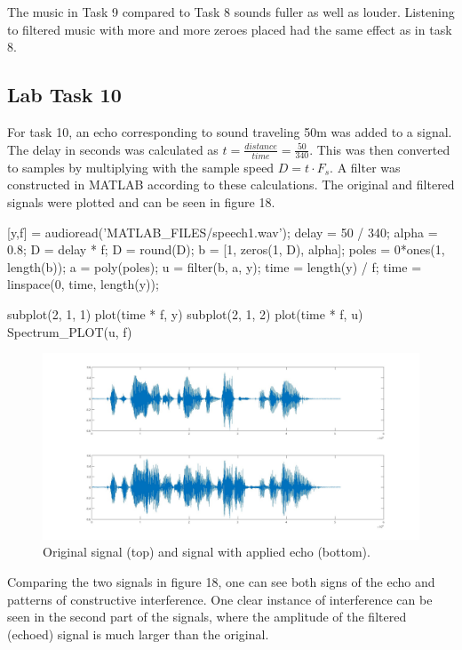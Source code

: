 \documentclass[a4paper,11pt]{article}
\begin{document}
The music in Task 9 compared to Task 8 sounds fuller as well as louder. Listening to filtered music with more and more zeroes placed had the same effect as in task 8. 

\subsection{Lab Task 10}
For task 10, an echo corresponding to sound traveling 50m was added to a signal.
The delay in seconds was calculated as $t = \frac{distance}{time} = \frac{50}{340}$. This was then converted to samples by multiplying with the sample speed $D = t \cdot F_s$. A filter was constructed in MATLAB according to these calculations. The original and filtered signals were plotted and can be seen in figure 18.
\begin{ffcode}
[y,f] = audioread('MATLAB_FILES/speech1.wav');
delay = 50 / 340;
alpha = 0.8;
D = delay * f;
D = round(D);
b = [1, zeros(1, D), alpha];
poles = 0*ones(1, length(b));
a = poly(poles);
u = filter(b, a, y);
time = length(y) / f;
time = linspace(0, time, length(y));

subplot(2, 1, 1)
plot(time * f, y)
subplot(2, 1, 2)
plot(time * f, u)
Spectrum_PLOT(u, f)
\end{ffcode}

\begin{figure}[H]
    \hspace{-40pt}\includegraphics[scale=0.28]{./images/Task10-Echo.jpg}
    \caption{Original signal (top) and signal with applied echo (bottom).}
    \label{fig:my_label}
\end{figure}

 

Comparing the two signals in figure 18, one can see both signs of the echo and patterns of constructive interference. One clear instance of interference can be seen in the second part of the signals, where the amplitude of the filtered (echoed) signal is much larger than the original.
\end{document}
